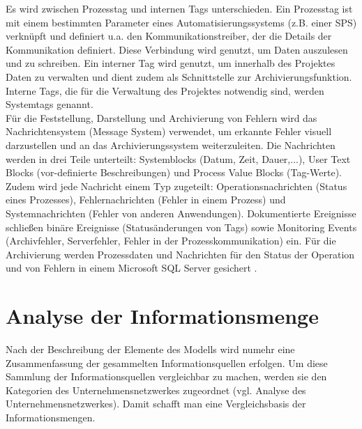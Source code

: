 Es wird zwischen Prozesstag und internen Tags unterschieden. Ein Prozesstag ist mit einem bestimmten Parameter eines Automatisierungssystems (z.B. einer SPS) verknüpft und definiert u.a. den Kommunikationstreiber, der die Details der Kommunikation definiert. Diese Verbindung wird genutzt, um Daten auszulesen und zu schreiben. Ein interner Tag wird genutzt, um innerhalb des Projektes Daten zu verwalten und dient zudem als Schnittstelle zur Archivierungsfunktion. Interne Tags, die für die Verwaltung des Projektes notwendig sind, werden Systemtags genannt\citep{WinCC3}. \\

Für die Feststellung, Darstellung und Archivierung von Fehlern wird das Nachrichtensystem (Message System) verwendet, um erkannte Fehler visuell darzustellen und an das Archivierungssystem weiterzuleiten. Die Nachrichten werden in drei Teile unterteilt: Systemblocks (Datum, Zeit, Dauer,...), User Text Blocks (vor-definierte Beschreibungen) und Process Value Blocks (Tag-Werte). Zudem wird jede Nachricht einem Typ zugeteilt: Operationsnachrichten (Status eines Prozesses), Fehlernachrichten (Fehler in einem Prozess) und Systemnachrichten (Fehler von anderen Anwendungen).
Dokumentierte Ereignisse schließen binäre Ereignisse (Statusänderungen von Tags) sowie \glqq Monitoring Events\grqq{} (Archivfehler, Serverfehler, Fehler in der Prozesskommunikation) ein. Für die Archivierung werden Prozessdaten und Nachrichten für den Status der Operation und von Fehlern in einem Microsoft SQL Server gesichert \citep{WinCC3}.



\section{Analyse der Informationsmenge}
Nach der Beschreibung der Elemente des Modells wird numehr eine Zusammenfassung der gesammelten Informationsquellen erfolgen. Um diese Sammlung der Informationsquellen vergleichbar zu machen, werden sie den Kategorien des Unternehmensnetzwerkes zugeordnet (vgl. Analyse des Unternehmensnetzwerkes). Damit schafft man eine Vergleichsbasis der Informationsmengen.

